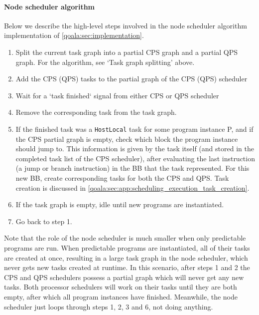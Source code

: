 \paragraph{Node scheduler algorithm}
Below we describe the high-level steps involved in the node scheduler algorithm implementation of \cref{qoala:sec:implementation}.
\label{qoala:sec:app:node_scheduler_algorithm}
\begin{enumerate}
    \item Split the current task graph into a partial CPS graph and a partial QPS graph. For the algorithm, see `Task graph splitting' above.
    \item Add the CPS (QPS) tasks to the partial graph of the CPS (QPS) scheduler
    \item Wait for a `task finished` signal from either CPS or QPS scheduler
    \item Remove the corresponding task from the task graph.
    \item If the finished task was a \texttt{HostLocal} task for some program instance P, and if the CPS partial graph is empty, check which block the program instance should jump to. This information is given by the task itself (and stored in the completed task list of the CPS scheduler), after evaluating the last instruction (a jump or branch instruction) in the BB that the task represented. For this new BB, create corresponding tasks for both the CPS and QPS. Task creation is discussed in \cref{qoala:sec:app:scheduling_execution_task_creation}.
    \item If the task graph is empty, idle until new programs are instantiated.
    \item Go back to step 1.
\end{enumerate}

Note that the role of the node scheduler is much smaller when only predictable programs are run.
When predictable programs are instantiated, all of their tasks are created at once, resulting in a large task graph in the node scheduler, which never gets new tasks created at runtime.
In this scenario, after steps 1 and 2 the CPS and QPS schedulers possess a partial graph which will never get any new tasks.
Both processor schedulers will work on their tasks until they are both empty, after which all program instances have finished. Meanwhile, the node scheduler just loops through steps 1, 2, 3 and 6, not doing anything.

